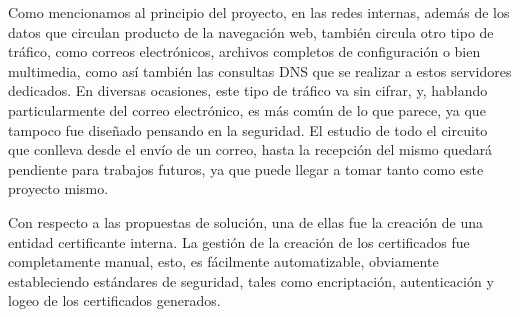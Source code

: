 Como mencionamos al principio del proyecto, en las redes internas, además de
los datos que circulan producto de la navegación web, también circula
otro tipo de tráfico, como correos electrónicos, archivos completos de 
configuración o bien multimedia, como así también las consultas DNS que 
se realizar a estos servidores dedicados. En diversas ocasiones, este 
tipo de tráfico va sin cifrar, y, hablando particularmente del correo electrónico,
es más común de lo que parece, ya que tampoco fue diseñado pensando en la 
seguridad. El estudio de todo el circuito que conlleva desde el envío de 
un correo, hasta la recepción del mismo quedará pendiente para trabajos futuros, 
ya que puede llegar a tomar tanto como este proyecto mismo.

Con respecto a las propuestas de solución, una de ellas fue la creación de una entidad 
certificante
interna. La gestión de la creación de los certificados fue completamente 
manual, esto, es fácilmente automatizable, obviamente estableciendo estándares 
de seguridad, tales como encriptación, autenticación y logeo de los 
certificados generados.